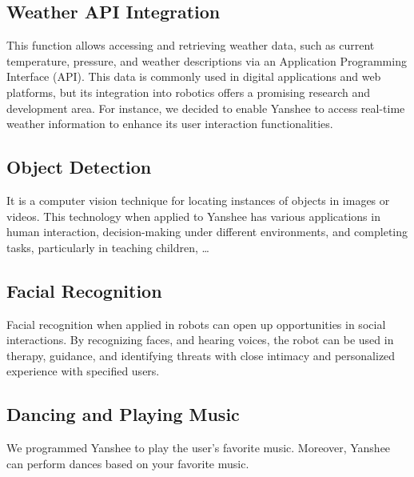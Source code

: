 \documentclass[12pt, a4paper]{article}
\begin{document}
\subsection{Weather API Integration}
This function allows accessing and retrieving weather data, such as current temperature, pressure, and weather descriptions via an Application Programming Interface (API). This data is commonly used in digital applications and web platforms, but its integration into robotics offers a promising research and development area. For instance, we decided to enable Yanshee to access real-time weather information to enhance its user interaction functionalities.
\subsection{Object Detection}
It is a computer vision technique for locating instances of objects in images or videos. This technology when applied to Yanshee has various applications in human interaction, decision-making under different environments, and completing tasks, particularly in teaching children, …
\subsection{Facial Recognition}
Facial recognition when applied in robots can open up opportunities in social interactions. By recognizing faces, and hearing voices, the robot can be used in therapy, guidance, and identifying threats with close intimacy and personalized experience with specified users.
\subsection{Dancing and Playing Music}
We programmed Yanshee to play the user's favorite music. Moreover, Yanshee can perform dances based on your favorite music.
\end{document}
